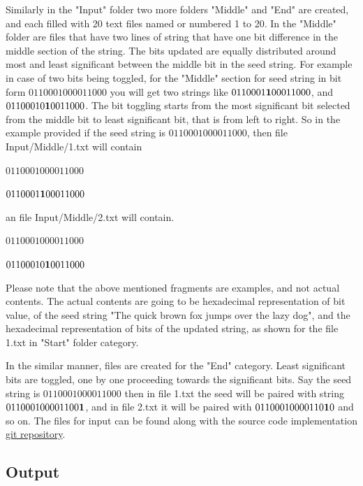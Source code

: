 Similarly in the "Input" folder two more folders "Middle" and "End" are created, and each filled with 20 text
files named or numbered 1 to 20. In the "Middle" folder are files that have two lines of string that have one
bit difference in the middle section of the string. The bits updated are equally distributed around most and least
significant between the middle bit in the seed string. For example in case of two bits being toggled, for the 
"Middle" section for seed string in bit form $01100010 00011000$ you will get two strings like $0110001{\bf 1}
00011000$, and $01100010 {\bf 1}0011000$. The bit toggling starts from the most significant bit selected from 
the middle bit to least significant bit, that is from left to right. So in the example provided if the seed string
is $01100010 00011000$, then file Input/Middle/1.txt will contain 

\begin{center}$01100010 00011000$

$0110001{\bf 1} 00011000$\end{center}

an file Input/Middle/2.txt will contain.

\begin{center}$01100010 00011000$

$01100010 {\bf 1}0011000$\end{center}

Please note that the above mentioned fragments are examples, and not actual contents. The actual contents are going
to be hexadecimal representation of bit value, of the seed string "The quick brown fox jumps over the lazy dog", and 
the hexadecimal representation of bits of the updated string, as shown for the file 1.txt in "Start" folder category.

In the similar manner, files are created for the "End" category. Least significant bits are toggled, one by one
proceeding towards the significant bits. Say the seed string is $01100010 00011000$ then in file 1.txt the seed will
be paired with string $01100010 0001100{\bf 1}$, and in file 2.txt it will be paired with $01100010 000110{\bf 1}0$
and so on. The files for input can be found along with the source code implementation
\href{"https://github.com/sxs9174/MSProjectCode/tree/master/MSProjectCode/Input"}{git repository}.

\subsection{Output}

